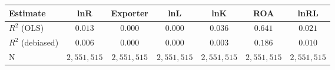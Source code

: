 \begin{tabular}{l*{6}{c}}
\hline\hline
 Estimate & lnR & Exporter & lnL & lnK & ROA & lnRL \\
\hline
\addlinespace $ R^2$ (OLS) & $0.013$ & $0.000$ & $0.000$ & $0.036$ & $0.641$ & $0.021$ \\
$ R^2$ (debiased) & $0.006$ & $0.000$ & $0.000$ & $0.003$ & $0.186$ & $0.010$ \\
N & $2,551,515$ & $2,551,515$ & $2,551,515$ & $2,551,515$ & $2,551,515$ & $2,551,515$ \\
\hline\hline
\end{tabular}
